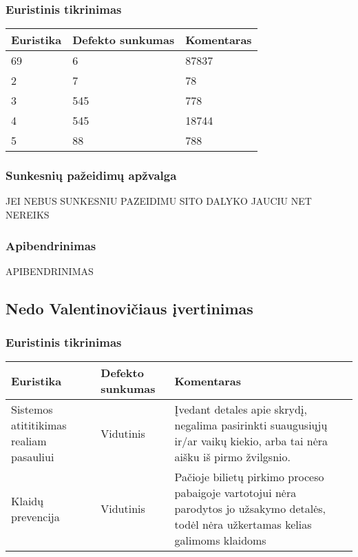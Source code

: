\documentclass{VUMIFPSkursinis}
\begin{document}
\subsubsection{Euristinis tikrinimas}
\begin{center}
 \begin{tabular}{|| p{4cm} | p{4cm} | p{8cm} ||} 
 \hline
 Euristika & Defekto sunkumas & Komentaras \\
 \hline\hline
 69 & 6 & 87837 \\ 
 \hline
 2 & 7 & 78 \\
 \hline
 3 & 545 & 778 \\
 \hline
 4 & 545 & 18744 \\
 \hline
 5 & 88 & 788 \\  %
 \hline                 %
\end{tabular}	
\end{center}

\subsubsection{Sunkesnių pažeidimų apžvalga}
JEI NEBUS SUNKESNIU PAZEIDIMU SITO DALYKO JAUCIU NET NEREIKS

\subsubsection{Apibendrinimas}
APIBENDRINIMAS

\subsection{Nedo Valentinovičiaus įvertinimas}
\subsubsection{Euristinis tikrinimas}
\begin{center}
 \begin{tabular}{|| p{4cm} | p{4cm} | p{8cm} ||} 
 \hline
 Euristika & Defekto sunkumas & Komentaras \\
 \hline\hline
 Sistemos atititikimas realiam pasauliui & Vidutinis & Įvedant detales apie skrydį, negalima pasirinkti suaugusiųjų ir/ar vaikų kiekio, arba tai nėra aišku iš pirmo žvilgsnio. \\ 
 \hline
 Klaidų prevencija & Vidutinis & Pačioje bilietų pirkimo proceso pabaigoje vartotojui nėra parodytos jo užsakymo detalės, todėl nėra užkertamas kelias galimoms klaidoms \\
 \hline
\end{tabular}	
\end{center}
\end{document}
